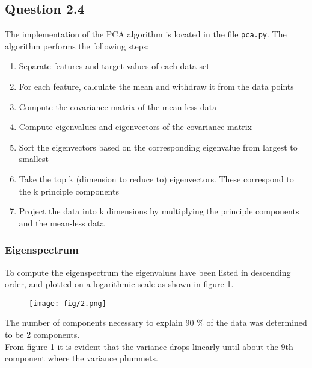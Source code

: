 \documentclass{article}
\begin{document}
\subsection{Question 2.4}
The implementation of the PCA algorithm is located in the file \texttt{pca.py}. The algorithm performs the following steps:
\begin{enumerate}
\item{Separate features and target values of each data set}
\item{For each feature, calculate the mean and withdraw it from the data points}
\item{Compute the covariance matrix of the mean-less data}
\item{Compute eigenvalues and eigenvectors of the covariance matrix}
\item{Sort the eigenvectors based on the corresponding eigenvalue from largest to smallest}
\item{Take the top k (dimension to reduce to) eigenvectors. These correspond to the k principle components}
\item{Project the data into k dimensions by multiplying the principle components and the mean-less data}
\end{enumerate}
\subsubsection{Eigenspectrum}
To compute the eigenspectrum the eigenvalues have been listed in descending order, and plotted on a logarithmic scale as shown in figure \ref{fig:eig}.
\begin{figure}[H]
  \centering
  \texttt{[image: fig/2.png]}
  \caption{}
  \label{fig:eig}
\end{figure}
The number of components necessary to explain 90 $\%$ of the data was determined to be 2 components. \\
From figure \ref{fig:eig} it is evident that the variance drops linearly until about the 9th component where the variance plummets.
\end{document}
